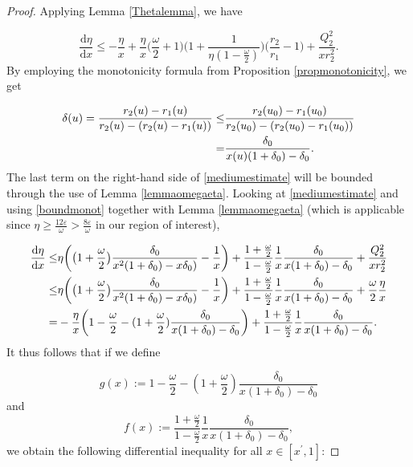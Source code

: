 \documentclass{article}[11pt]
\numberwithin{equation}{section}
\begin{document}
\begin{proof}
\noindent Applying Lemma \ref{Thetalemma}, we have

\begin{equation}\label{mediumestimate} \frac{\text{d}\eta}{\text{d}x}\leq -\frac{\eta}{x} + \frac{\eta}{x}\big(\frac{\omega}{2}+1\big)\bigg(1+ \frac{1}{\eta(1-\frac{\omega}{2})}\bigg) \big(\frac{r_2}{r_1}-1\big) + \frac{Q_2^2}{xr_2^2}. \end{equation}By employing the monotonicity formula from Proposition 
\ref{propmonotonicity}, we get

\begin{align}\label{boundmonot}
\delta(u)= \frac{r_2(u)-r_1(u)}{r_2(u)-(r_2(u)-r_1(u))}\leq& \frac{r_2(u_0)-r_1(u_0)}{r_2(u_0)-(r_2(u_0)-r_1(u_0))} \notag \\ =& \frac{\delta_0}{x(u)(1+\delta_0)-\delta_0}. 
\end{align}The last term on the right-hand side of \eqref{mediumestimate} will be bounded through the use of Lemma \ref{lemmaomegaeta}. Looking at \eqref{mediumestimate} and using \eqref{boundmonot} together with Lemma \ref{lemmaomegaeta} (which is applicable since $\eta \geq \frac{12\varepsilon}{\omega}>\frac{8\varepsilon}{\omega}$ in our region of interest),

\begin{align}
\frac{\text{d}\eta}{\text{d}x}\leq& \eta \bigg(\big(1+\frac{\omega}{2}\big) \frac{\delta_0}{x^2(1+\delta_0)-x\delta_0)}-\frac{1}{x}\bigg) +\frac{1+\frac{\omega}{2}}{1-\frac{\omega}{2}} \frac{1}{x}\frac{\delta_0}{x(1+\delta_0)-\delta_0}+\frac{Q_2^2}{xr_2^2} \notag \\ \leq&\eta \bigg(\big(1+\frac{\omega}{2}\big) \frac{\delta_0}{x^2(1+\delta_0)-x\delta_0)}-\frac{1}{x}\bigg) +\frac{1+\frac{\omega}{2}}{1-\frac{\omega}{2}} \frac{1}{x}\frac{\delta_0}{x(1+\delta_0)-\delta_0}+\frac{\omega}{2}\frac{\eta}{x} \notag \\ =& -\frac{\eta}{x} \bigg(1-\frac{\omega}{2} - (1+\frac{\omega}{2}) \frac{\delta_0}{x(1+\delta_0)-\delta_0} \bigg) +\frac{1+\frac{\omega}{2}}{1-\frac{\omega}{2}} \frac{1}{x}\frac{\delta_0}{x(1+\delta_0)-\delta_0}.\notag
\end{align}It thus follows that if we define

\[ g(x):=   1-\frac{\omega}{2} - (1+\frac{\omega}{2}) \frac{\delta_0}{x(1+\delta_0)-\delta_0}  \]and \[f(x) :=\frac{1+\frac{\omega}{2}}{1-\frac{\omega}{2}} \frac{1}{x}\frac{\delta_0}{x(1+\delta_0)-\delta_0},  \]we obtain the following differential inequality for all $x\in [x^{\prime},1]$:


\end{proof}
\end{document}
